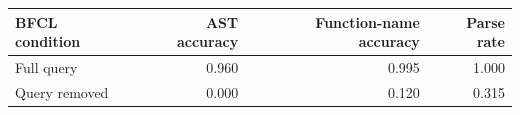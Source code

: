 \begin{tabular}{lrrr}
\toprule
BFCL condition & AST accuracy & Function-name accuracy & Parse rate \\
\midrule
Full query & 0.960 & 0.995 & 1.000 \\
Query removed & 0.000 & 0.120 & 0.315 \\
\bottomrule
\end{tabular}
